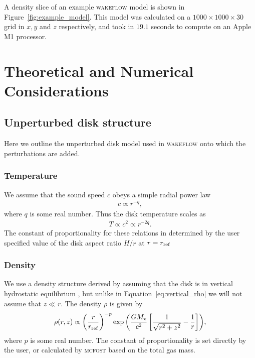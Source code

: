 \noindent A density slice of an example \textsc{wakeflow} model is shown in Figure~\ref{fig:example_model}.
This model was calculated on a $1000 \times 1000 \times 30$ grid in $x,y$ and $z$ respectively, and took in $19.1$ seconds to compute on an Apple M1 processor.

\section{Theoretical and Numerical Considerations} \label{sec:model_considerations}

\subsection{Unperturbed disk structure} \label{sec:diskstruct}

Here we outline the unperturbed disk model used in \textsc{wakeflow} onto which the perturbations are added.

\subsubsection{Temperature}

We assume that the sound speed $c$ obeys a simple radial power law 
\begin{align}
    c \propto r^{-q},
\end{align}
where $q$ is some real number. Thus the disk temperature scales as 
\begin{align}
    T \propto c^2 \propto r^{-2q}.
\end{align}
The constant of proportionality for these relations in determined by the user specified value of the disk aspect ratio $H/r$ at $r=r_{\rm ref}$

\subsubsection{Density}

We use a density structure derived by assuming that the disk is in vertical hydrostatic equilibrium \citep{pringle1981}, but unlike in Equation~\eqref{eq:vertical_rho} we will not assume that $z\ll r$.
The density $\rho$ is given by 
\begin{align}
    \rho(r,z) \propto \left( \frac{r}{r_{\rm ref}} \right)^{-p} \exp{\left( \frac{G M_\star}{c^2} \left[ \frac{1}{\sqrt{r^2 + z^2}} - \frac{1}{r} \right] \right)},
\end{align}
where $p$ is some real number. 
The constant of proportionality is set directly by the user, or calculated by \textsc{mcfost} based on the total gas mass.

